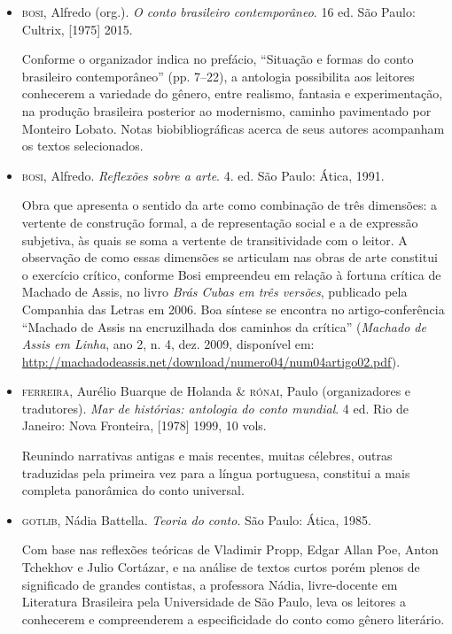 \begin{itemize}
\item \textsc{bosi}, Alfredo (org.). \emph{O conto brasileiro contemporâneo}. 16 ed.
São Paulo: Cultrix, {[}1975{]} 2015.

Conforme o organizador indica no
prefácio, ``Situação e formas do conto brasileiro contemporâneo'' (pp.
7--22), a antologia possibilita aos leitores conhecerem a variedade do
gênero, entre realismo, fantasia e experimentação, na produção
brasileira posterior ao modernismo, caminho pavimentado por Monteiro
Lobato. Notas biobibliográficas acerca de seus autores acompanham os
textos selecionados.

\item \textsc{bosi}, Alfredo. \emph{Reflexões sobre a arte}. 4. ed. São Paulo: Ática,
1991.

Obra que apresenta o sentido da arte como combinação de três
dimensões: a vertente de construção formal, a de representação social e
a de expressão subjetiva, às quais se soma a vertente de transitividade
com o leitor. A observação de como essas dimensões se articulam nas
obras de arte constitui o exercício crítico, conforme Bosi empreendeu em
relação à fortuna crítica de Machado de Assis, no livro \emph{Brás Cubas
em três versões}, publicado pela Companhia das Letras em 2006. Boa
síntese se encontra no artigo-conferência ``Machado de Assis na
encruzilhada dos caminhos da crítica'' (\emph{Machado de Assis em
Linha}, ano 2, n. 4, dez. 2009, disponível em:
\url{http://machadodeassis.net/download/numero04/num04artigo02.pdf}).

\item \textsc{ferreira}, Aurélio Buarque de Holanda \& \textsc{rónai}, Paulo (organizadores e
tradutores). \emph{Mar de histórias: antologia do conto mundial}. 4 ed.
Rio de Janeiro: Nova Fronteira, {[}1978{]} 1999, 10 vols.

Reunindo
narrativas antigas e mais recentes, muitas célebres, outras traduzidas
pela primeira vez para a língua portuguesa, constitui a mais completa
panorâmica do conto universal.

\item \textsc{gotlib}, Nádia Battella. \emph{Teoria do conto}. São Paulo: Ática, 1985.

Com base nas reflexões teóricas de Vladimir Propp, Edgar Allan Poe,
Anton Tchekhov e Julio Cortázar, e na análise de textos curtos porém
plenos de significado de grandes contistas, a professora Nádia,
livre-docente em Literatura Brasileira pela Universidade de São Paulo,
leva os leitores a conhecerem e compreenderem a especificidade do conto
como gênero literário.


\end{itemize}
